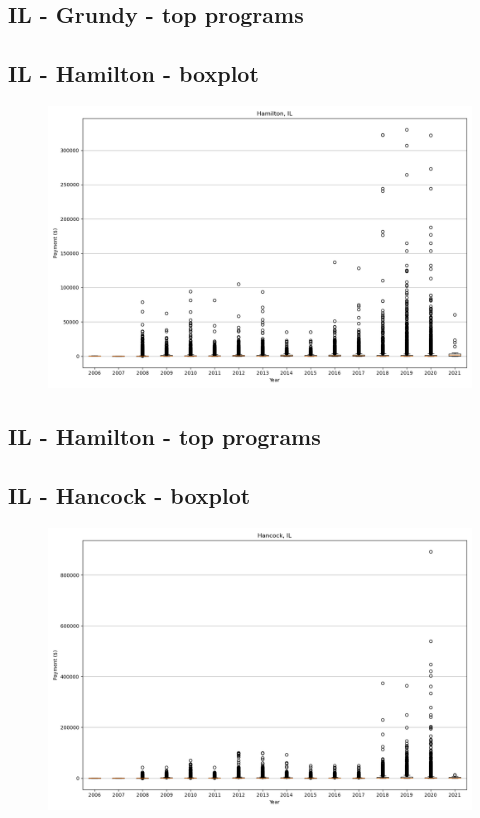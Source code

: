 \subsection*{IL - Grundy - top programs}

\newpage
\subsection*{IL - Hamilton - boxplot}
\begin{figure}[h]
\centering
\includegraphics[width=7in]{../output/boxplots/counties/Hamilton-IL_boxplot.png}
\end{figure}


\subsection*{IL - Hamilton - top programs}

\newpage
\subsection*{IL - Hancock - boxplot}
\begin{figure}[h]
\centering
\includegraphics[width=7in]{../output/boxplots/counties/Hancock-IL_boxplot.png}
\end{figure}


